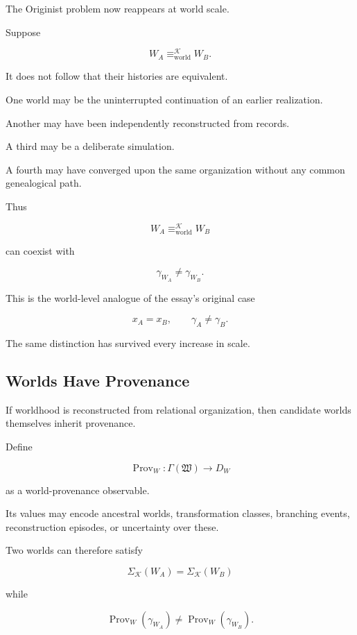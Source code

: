 \documentclass[
  11pt,
  a4paper,
  DIV=12,
  BCOR=0mm,
  parskip=half-
]{scrartcl}
\newcommand{\traj}[1]{\gamma_{#1}}
\newcommand{\eqworld}{%
  \equiv_{\mathrm{world}}%
}
\newcommand{\Prov}{\operatorname{Prov}}
\theoremstyle{definition}
\theoremstyle{plain}
\theoremstyle{remark}
\begin{document}
The Originist problem now reappears at world scale.

Suppose

\[
  W_A\eqworld^{\mathcal K}W_B.
\]

It does not follow that their histories are equivalent.

One world may be the uninterrupted continuation of an earlier realization.

Another may have been independently reconstructed from records.

A third may be a deliberate simulation.

A fourth may have converged upon the same organization without any common
genealogical path.

Thus

\[
  W_A\eqworld^{\mathcal K}W_B
\]

can coexist with

\[
  \traj{W_A}\neq\traj{W_B}.
\]

This is the world-level analogue of the essay's original case

\[
  x_A=x_B,
  \qquad
  \gamma_A\neq\gamma_B.
\]

The same distinction has survived every increase in scale.


\subsection{Worlds Have Provenance}
\label{app:world-provenance}

If worldhood is reconstructed from relational organization, then candidate
worlds themselves inherit provenance.

Define

\[
  \Prov_W:
  \Gamma(\mathfrak W)
  \to
  D_W
\]

as a world-provenance observable.

Its values may encode ancestral worlds, transformation classes, branching
events, reconstruction episodes, or uncertainty over these.

Two worlds can therefore satisfy

\[
  \Sigma_{\mathcal K}(W_A)
  =
  \Sigma_{\mathcal K}(W_B)
\]

while

\[
  \Prov_W(\traj{W_A})
  \neq
  \Prov_W(\traj{W_B}).
\]
\end{document}
